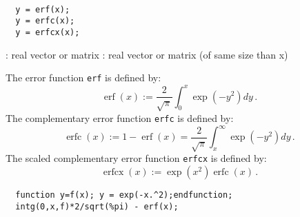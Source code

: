 \begin{mandesc}
  \\
  \\
  \\
\end{mandesc}
\begin{calling_sequence}
\begin{verbatim}
  y = erf(x);
  y = erfc(x);  
  y = erfcx(x);  
\end{verbatim}
\end{calling_sequence}
\begin{parameters}
  \begin{varlist}
    : real vector or matrix
    : real vector or matrix (of same size than x)
  \end{varlist}
\end{parameters}

\begin{mandescription}
  The error function \verb+erf+ is defined by:
\[
  \operatorname{erf}(x) :=\frac{2}{\sqrt{\pi}} \int_0^x \exp(-y^2) dy \,.
\]
  The complementary error function \verb+erfc+ is defined by:
\[
\operatorname{erfc}(x) := 1 - \operatorname{erf}(x) = \frac{2}{\sqrt{\pi}} \int_x^{\infty} \exp(-y^2)dy \,.
\]
The scaled complementary error function \verb+erfcx+ is defined by:
\[
\operatorname{erfcx}(x) := \exp(x^2) \operatorname{erfc}(x)\,.
\]
\end{mandescription}

\begin{examples}
\begin{Verbatim}
  function y=f(x); y = exp(-x.^2);endfunction;
  intg(0,x,f)*2/sqrt(%pi) - erf(x);
\end{Verbatim}
\end{examples}

